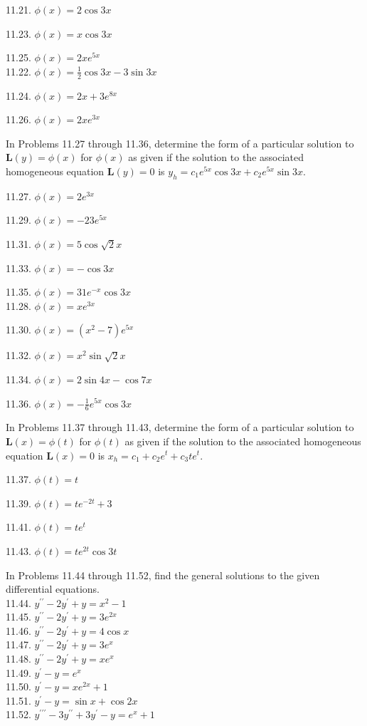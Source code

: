 \documentclass[10pt]{article}
\begin{document}
11.21. $\phi(x)=2 \cos 3 x$

11.23. $\phi(x)=x \cos 3 x$

11.25. $\phi(x)=2 x e^{5 x}$\\
11.22. $\phi(x)=\frac{1}{2} \cos 3 x-3 \sin 3 x$

11.24. $\phi(x)=2 x+3 e^{8 x}$

11.26. $\phi(x)=2 x e^{3 x}$

In Problems 11.27 through 11.36, determine the form of a particular solution to $\mathbf{L}(y)=\phi(x)$ for $\phi(x)$ as given if the solution to the associated homogeneous equation $\mathbf{L}(y)=0$ is $y_{h}=c_{1} e^{5 x} \cos 3 x+c_{2} e^{5 x} \sin 3 x$.

11.27. $\phi(x)=2 e^{3 x}$

11.29. $\phi(x)=-23 e^{5 x}$

11.31. $\phi(x)=5 \cos \sqrt{2} x$

11.33. $\phi(x)=-\cos 3 x$

11.35. $\phi(x)=31 e^{-x} \cos 3 x$\\
11.28. $\phi(x)=x e^{3 x}$

11.30. $\phi(x)=\left(x^{2}-7\right) e^{5 x}$

11.32. $\phi(x)=x^{2} \sin \sqrt{2} x$

11.34. $\phi(x)=2 \sin 4 x-\cos 7 x$

11.36. $\phi(x)=-\frac{1}{6} e^{5 x} \cos 3 x$

In Problems 11.37 through 11.43, determine the form of a particular solution to $\mathbf{L}(x)=\phi(t)$ for $\phi(t)$ as given if the solution to the associated homogeneous equation $\mathbf{L}(x)=0$ is $x_{h}=c_{1}+c_{2} e^{t}+c_{3} t e^{t}$.

11.37. $\phi(t)=t$

11.39. $\phi(t)=t e^{-2 t}+3$

11.41. $\phi(t)=t e^{t}$

11.43. $\phi(t)=t e^{2 t} \cos 3 t$

In Problems 11.44 through 11.52, find the general solutions to the given differential equations.\\
11.44. $y^{\prime \prime}-2 y^{\prime}+y=x^{2}-1$\\
11.45. $y^{\prime \prime}-2 y^{\prime}+y=3 e^{2 x}$\\
11.46. $y^{\prime \prime}-2 y^{\prime}+y=4 \cos x$\\
11.47. $y^{\prime \prime}-2 y^{\prime}+y=3 e^{x}$\\
11.48. $y^{\prime \prime}-2 y^{\prime}+y=x e^{x}$\\
11.49. $y^{\prime}-y=e^{x}$\\
11.50. $y^{\prime}-y=x e^{2 x}+1$\\
11.51. $y^{\prime}-y=\sin x+\cos 2 x$\\
11.52. $y^{\prime \prime \prime}-3 y^{\prime \prime}+3 y^{\prime}-y=e^{x}+1$
\end{document}

